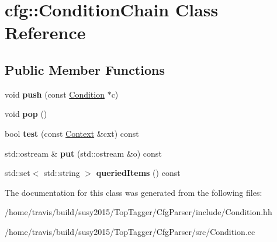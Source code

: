 \hypertarget{classcfg_1_1ConditionChain}{\section{cfg\-:\-:Condition\-Chain Class Reference}
\label{classcfg_1_1ConditionChain}
}
\subsection*{Public Member Functions}
\begin{DoxyCompactItemize}
\item 
\hypertarget{classcfg_1_1ConditionChain_a96b7f3d5277cff3fd72bb842edbe5528}{void {\bfseries push} (const \hyperlink{classcfg_1_1Condition}{Condition} $\ast$c)}\label{classcfg_1_1ConditionChain_a96b7f3d5277cff3fd72bb842edbe5528}

\item 
\hypertarget{classcfg_1_1ConditionChain_a22fff931b71405e4e83af359c0068c1f}{void {\bfseries pop} ()}\label{classcfg_1_1ConditionChain_a22fff931b71405e4e83af359c0068c1f}

\item 
\hypertarget{classcfg_1_1ConditionChain_adf1c15e54087ff4a0421e32d63cc377d}{bool {\bfseries test} (const \hyperlink{classcfg_1_1Context}{Context} \&cxt) const }\label{classcfg_1_1ConditionChain_adf1c15e54087ff4a0421e32d63cc377d}

\item 
\hypertarget{classcfg_1_1ConditionChain_a3c44052b97a29ad20765b350a54e8cb9}{std\-::ostream \& {\bfseries put} (std\-::ostream \&o) const }\label{classcfg_1_1ConditionChain_a3c44052b97a29ad20765b350a54e8cb9}

\item 
\hypertarget{classcfg_1_1ConditionChain_a3265eb068000bb12d8f0f23753d51b85}{std\-::set$<$ std\-::string $>$ {\bfseries queried\-Items} () const }\label{classcfg_1_1ConditionChain_a3265eb068000bb12d8f0f23753d51b85}

\end{DoxyCompactItemize}


The documentation for this class was generated from the following files\-:\begin{DoxyCompactItemize}
\item 
/home/travis/build/susy2015/\-Top\-Tagger/\-Cfg\-Parser/include/Condition.\-hh\item 
/home/travis/build/susy2015/\-Top\-Tagger/\-Cfg\-Parser/src/Condition.\-cc\end{DoxyCompactItemize}
